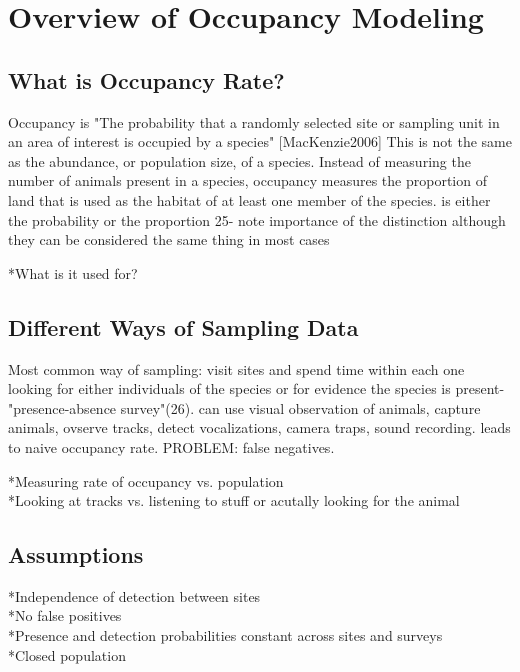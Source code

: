 \documentclass{article}
\begin{document}
\section{Overview of Occupancy Modeling}

	\subsection{What is Occupancy Rate?}

		Occupancy is "The probability that a randomly selected site or sampling 
unit in an area of interest is occupied by a species" [MacKenzie2006] This is 
not the same as the abundance, or population size, of a species.  Instead of 
measuring the number of animals present in a species, occupancy measures the 
proportion of land that is used as the habitat of at least one member of the 
species. 
	is either the probability or the proportion 25-  note importance of the 
distinction although they can be considered the same thing in most cases 
		
		*What is it used for?

	\subsection{Different Ways of Sampling Data}
		Most common way of sampling:  visit sites and spend time within each one 
looking for either individuals of the species or for evidence the species is 
present- "presence-absence survey"(26).  can use visual observation of animals,
capture animals, ovserve tracks, detect vocalizations, camera traps, sound 
recording.  leads to naive occupancy rate.  PROBLEM: false negatives.
		
		*Measuring rate of occupancy vs. population \\
		*Looking at tracks vs. listening to stuff or acutally looking for the 
			animal

	\subsection{Assumptions}
		*Independence of detection between sites \\
		*No false positives \\
		*Presence and detection probabilities constant across sites and surveys \\
		*Closed population
\end{document}
